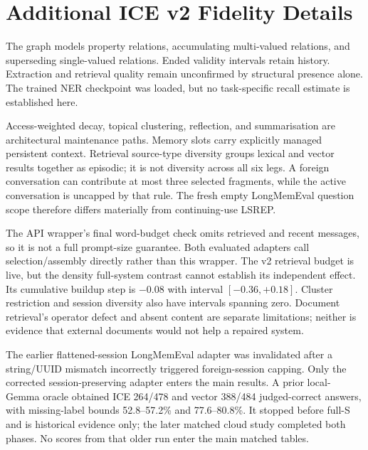 \documentclass[11pt]{article}
\begin{document}
\section{Additional ICE v2 Fidelity Details}
The graph models property relations, accumulating multi-valued relations, and superseding single-valued relations. Ended validity intervals retain history. Extraction and retrieval quality remain unconfirmed by structural presence alone. The trained NER checkpoint was loaded, but no task-specific recall estimate is established here.

Access-weighted decay, topical clustering, reflection, and summarisation are architectural maintenance paths. Memory slots carry explicitly managed persistent context. Retrieval source-type diversity groups lexical and vector results together as episodic; it is not diversity across all six legs. A foreign conversation can contribute at most three selected fragments, while the active conversation is uncapped by that rule. The fresh empty LongMemEval question scope therefore differs materially from continuing-use LSREP.

The API wrapper's final word-budget check omits retrieved and recent messages, so it is not a full prompt-size guarantee. Both evaluated adapters call selection/assembly directly rather than this wrapper. The v2 retrieval budget is live, but the density full-system contrast cannot establish its independent effect. Its cumulative buildup step is $-0.08$ with interval $[-0.36,+0.18]$. Cluster restriction and session diversity also have intervals spanning zero. Document retrieval's operator defect and absent content are separate limitations; neither is evidence that external documents would not help a repaired system.

The earlier flattened-session LongMemEval adapter was invalidated after a string/UUID mismatch incorrectly triggered foreign-session capping. Only the corrected session-preserving adapter enters the main results. A prior local-Gemma oracle obtained ICE 264/478 and vector 388/484 judged-correct answers, with missing-label bounds 52.8--57.2\% and 77.6--80.8\%. It stopped before full-S and is historical evidence only; the later matched cloud study completed both phases. No scores from that older run enter the main matched tables.
\end{document}

